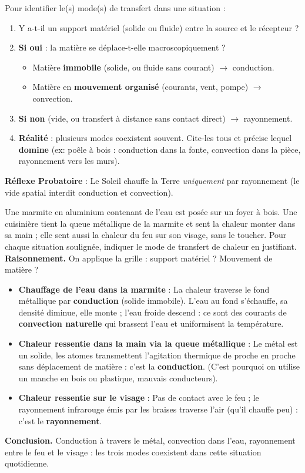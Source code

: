 \documentclass[11pt]{article}
\newcommand{\cle}[1]{{\popxbold\color{popdark}#1}}
\begin{document}
\begin{methode}
Pour identifier le(s) mode(s) de transfert dans une situation :
\begin{enumerate}
\item Y a-t-il un \cle{support matériel} (solide ou fluide) entre la source et le récepteur ?
\item \textbf{Si oui} : la matière se déplace-t-elle macroscopiquement ?
  \begin{itemize}
  \item Matière \textbf{immobile} (solide, ou fluide sans courant) $\to$ \cle{conduction}.
  \item Matière en \textbf{mouvement organisé} (courants, vent, pompe) $\to$ \cle{convection}.
  \end{itemize}
\item \textbf{Si non} (vide, ou transfert à distance sans contact direct) $\to$ \cle{rayonnement}.
\item \textbf{Réalité} : plusieurs modes coexistent souvent. Cite-les tous et précise lequel \textbf{domine} (ex: poêle à bois : conduction dans la fonte, convection dans la pièce, rayonnement vers les murs).
\end{enumerate}
\textbf{Réflexe Probatoire} : Le Soleil chauffe la Terre \emph{uniquement} par rayonnement (le vide spatial interdit conduction et convection).
\end{methode}

\begin{exoresolu}
Une marmite en aluminium contenant de l'eau est posée sur un foyer à bois. Une cuisinière tient la queue métallique de la marmite et sent la chaleur monter dans sa main ; elle sent aussi la chaleur du feu sur son visage, sans le toucher. Pour chaque situation soulignée, indiquer le mode de transfert de chaleur en justifiant.
\tcblower
\textbf{Raisonnement.} On applique la grille : support matériel ? Mouvement de matière ?
\begin{itemize}
\item \textbf{Chauffage de l'eau dans la marmite} : La chaleur traverse le fond métallique par \textbf{conduction} (solide immobile). L'eau au fond s'échauffe, sa densité diminue, elle monte ; l'eau froide descend : ce sont des courants de \textbf{convection naturelle} qui brassent l'eau et uniformisent la température.
\item \textbf{Chaleur ressentie dans la main via la queue métallique} : Le métal est un solide, les atomes transmettent l'agitation thermique de proche en proche sans déplacement de matière : c'est la \textbf{conduction}. (C'est pourquoi on utilise un manche en bois ou plastique, mauvais conducteurs).
\item \textbf{Chaleur ressentie sur le visage} : Pas de contact avec le feu ; le rayonnement infrarouge émis par les braises traverse l'air (qu'il chauffe peu) : c'est le \textbf{rayonnement}.
\end{itemize}
\textbf{Conclusion.} Conduction à travers le métal, convection dans l'eau, rayonnement entre le feu et le visage : les trois modes coexistent dans cette situation quotidienne.
\end{exoresolu}
\end{document}
